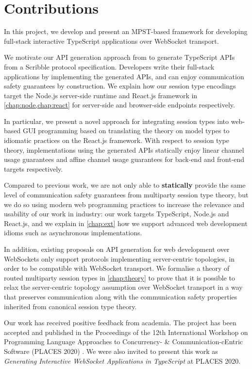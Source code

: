 \section{Contributions}

In this project, we develop and present an
MPST-based framework for developing full-stack
interactive TypeScript applications over WebSocket transport.

We motivate our API generation approach from 
\cite{Hybrid2016,PureScript2019} to generate TypeScript APIs
from a Scribble protocol specification.
Developers write their full-stack applications
by implementing the generated APIs, and can enjoy 
communication safety guarantees by construction.
We explain how our session type encodings target the Node.js
server-side runtime and React.js framework in
\cref{chap:node,chap:react} for server-side
and browser-side endpoints respectively.

In particular, we present a novel approach for integrating
session types into web-based GUI programming based on
translating the theory on model types \cite{MVU2020}
to idiomatic practices on the React.js framework.
With respect to session type theory, implementations using
the generated APIs statically enjoy linear channel usage
guarantees and affine channel usage guarantees for back-end
and front-end targets respectively.

Compared to previous work, we are not only able to
\textbf{statically} provide the same level of communication safety
guarantees from multiparty session type theory, but we do so
using modern web programming practices to increase
the relevance and usability of our work in industry:
our work targets TypeScript, Node.js and React.js,
and we explain in \cref{chap:ext} how we support advanced
web development idioms such as asynchronous implementations.

In addition, existing proposals on API generation for web development
over WebSockets \cite{PureScript2019} only support protocols
implementing server-centric topologies, in order to be 
compatible with WebSocket transport.
We formalise a theory of routed multiparty session types in 
\cref{chap:theory} to prove that it is possible to relax the
server-centric topology assumption over WebSocket transport in a way 
that preserves communication along with the communication safety 
properties inherited from canonical session type theory.

Our work has received positive feedback from academia.
The project has been accepted and published in the
Proceedings of the 12th International Workshop on
Programming Language Approaches to Concurrency- \& 
Communication-cEntric Software (PLACES 2020) \cite{PLACES2020}.
We were also invited to present this work as 
\emph{Generating Interactive WebSocket Applications in TypeScript}
at PLACES 2020.

